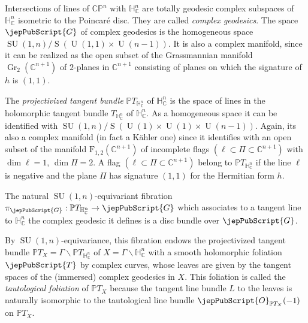 Intersections of lines of $\mathbb{CP}^n$ with $\mathbb H^n_{\mathbb C}$ are totally geodesic complex subspaces of $\mathbb H^n_{\mathbb C}$ isometric to the Poincaré disc. They are called \emph{complex geodesics}. The space $\jepPubScript{G}$ of complex geodesics is the homogeneous space $\operatorname{SU}(1,n)/\operatorname S(\operatorname U(1,1)\times\operatorname U(n-1))$. It is also a complex manifold, since it can be realized as the open subset of the Grassmannian manifold $\operatorname{Gr}_2(\mathbb C^{n+1})$ of $2$-planes in $\mathbb C^{n+1}$ consisting of planes on which the signature of $h$ is $(1,1)$.

The \emph{projectivized tangent bundle} $\mathbb PT_{\mathbb H^n_{\mathbb C}}$ of $\mathbb H^n_{\mathbb C}$ is the space of lines in the holomorphic tangent bundle $T_{\mathbb H^n_{\mathbb C}}$ of $\mathbb H^n_{\mathbb C}$. As a homogeneous space it can be identified with $\operatorname{SU}(1,n)/\operatorname S(\operatorname U(1)\times\operatorname U(1)\times\operatorname U(n-1))$. Again, its also a complex manifold (in fact a Kähler one) since it identifies with an open subset of the manifold $\mathrm F_{1,2}(\mathbb C^{n+1})$ of incomplete flags $(\ell\subset\Pi\subset\mathbb C^{n+1})$ with $\dim\ell=1$, $\dim\Pi=2$. A flag $(\ell\subset\Pi\subset\mathbb C^{n+1})$ belong to $\mathbb PT_{\mathbb H^n_{\mathbb C}}$ if the line $\ell$ is negative and the plane $\Pi$ has signature $(1,1)$ for the Hermitian form $h$.

The natural $\operatorname{SU}(1,n)$-equivariant fibration $\pi_{\jepPubScript{G}}:\mathbb PT_{\mathbb H^n_{\mathbb C}}\to\jepPubScript{G}$ which associates to a tangent line to $\mathbb H^n_{\mathbb C}$ the complex geodesic it defines is a disc bundle over $\jepPubScript{G}$.

By $\operatorname{SU}(1,n)$-equivariance, this fibration endows the projectivized tangent bundle $\mathbb PT_X=\Gamma\backslash\mathbb PT_{\mathbb H^n_{\mathbb C}}$ of $X=\Gamma\backslash\mathbb H^n_{\mathbb C}$ with a smooth holomorphic foliation $\jepPubScript{T}$ by complex curves, whose leaves are given by the tangent spaces of the (immersed) complex geodesics in $X$. This foliation is called the \emph{tautological foliation} of $\mathbb PT_X$ because the tangent line bundle $L$ to the leaves is naturally isomorphic to the tautological line bundle $\jepPubScript{O}_{\mathbb PT_X}(-1)$ on $\mathbb PT_X$.

